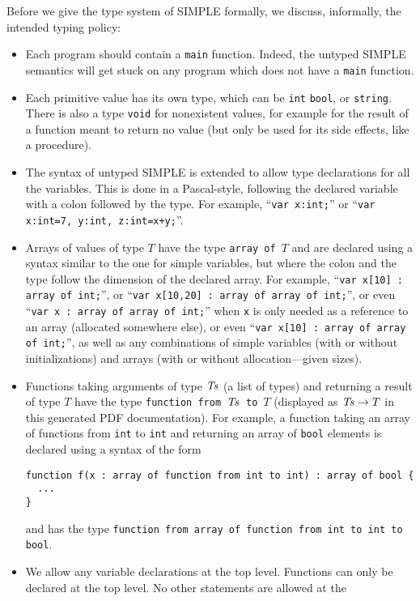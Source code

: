 \begin{latexComment}
Before we give the \K type system of SIMPLE formally, we discuss, informally,
the intended typing policy:
\begin{itemize}
\item Each program should contain a \texttt{main} function.  Indeed, the
untyped SIMPLE semantics will get stuck on any program which does not have a
\texttt{main} function.
\item Each primitive value has its own type, which can be \texttt{int}
\texttt{bool}, or \texttt{string}.  There is also a type \texttt{void} for
nonexistent values, for example for the result of a function meant to return
no value (but only be used for its side effects, like a procedure).
\item The syntax of untyped SIMPLE is extended to allow type declarations for
all the variables.  This is done in a Pascal-style, following the declared
variable with a colon followed by the type.  For example,
``\texttt{var x:int;}'' or ``\texttt{var x:int=7, y:int, z:int=x+y;}''.
\item Arrays of values of type $T$ have the type \texttt{array of $T$} and
are declared using a syntax similar to the one for simple variables, but
where the colon and the type follow the dimension of the declared array.
For example, ``\texttt{var x[10] : array of int;}'', or
``\texttt{var x[10,20] : array of array of int;}'', or even
``\texttt{var x : array of array of int;}'' when \texttt{x} is only needed
as a reference to an array (allocated somewhere else), or even
``\texttt{var x[10] : array of array of int;}'', as well as any combinations of
simple variables (with or without initializations) and arrays (with or without
allocation---given sizes).
\item Functions taking arguments of type $\it Ts$ (a list of types) and
returning a result of type $T$ have the type
\texttt{function from $\it Ts$ to $T$} (displayed as ${\it Ts}\rightarrow T$
in this generated PDF documentation).  For example, a function taking an
array of functions from \texttt{int} to \texttt{int} and returning an array
of \texttt{bool} elements is declared using a syntax of the form
\begin{verbatim}
function f(x : array of function from int to int) : array of bool {
  ...
}
\end{verbatim}
and has the type
\texttt{function from array of function from int to int to bool}.
\item We allow any variable declarations at the top level.  Functions can
only be declared at the top level.  No other statements are allowed at the

\end{itemize}
\end{latexComment}
